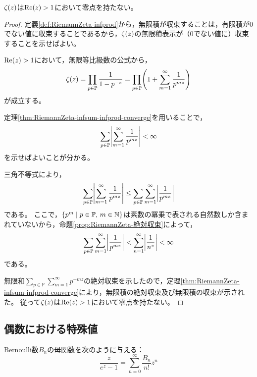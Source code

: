 \documentclass[a4paper,draft]{ltjsarticle}
\begin{document}
\begin{thm}
    $\fun{\zeta}{z}$は$\re{z}>1$において零点を持たない。
    \begin{proof}
        定義\ref{def:RiemannZeta-infprod}から，無限積が収束することは，有限積が$0$でない値に収束することであるから，$\fun{\zeta}{z}$の無限積表示が（$0$でない値に）収束することを示せばよい。

        $\re{z}>1$において，無限等比級数の公式から，
        \begin{equation}
            \fun{\zeta}{z}=\prod_{p\in\mathbb{P}}\frac{1}{1-p^{-z}}=\prod_{p\in\mathbb{P}}\pare{1+\sum_{m=1}^\infty \frac{1}{p^{mz}}}
        \end{equation}
        が成立する。

        定理\ref{thm:RiemannZeta-infsum-infprod-converge}を用いることで，
        \begin{equation}
            \sum_{p\in\mathbb{P}}\abs{\sum_{m=1}^\infty \frac{1}{p^{mz}}}<\infty
        \end{equation}
        を示せばよいことが分かる。

        三角不等式により，
        \begin{equation}
            \sum_{p\in\mathbb{P}}\abs{\sum_{m=1}^\infty \frac{1}{p^{mz}}}
            \leq\sum_{p\in\mathbb{P}}\sum_{m=1}^\infty \abs{\frac{1}{p^{mz}}}
        \end{equation}
        である。
        ここで，$\sset{p^m}{p\in\mathbb{P},\, m\in\N}$は素数の冪乗で表される自然数しか含まれていないから，命題\ref{prop:RiemannZeta-絶対収束}によって，
        \begin{equation}
            \sum_{p\in\mathbb{P}}\sum_{m=1}^\infty \abs{\frac{1}{p^{mz}}}<\sum_{n=1}^\infty \abs{\frac{1}{n^z}}<\infty
        \end{equation}
        である。

        無限和$\sum_{p\in\mathbb{P}}\sum_{m=1}^\infty p^{-mz}$の絶対収束を示したので，定理\ref{thm:RiemannZeta-infsum-infprod-converge}により，無限積の絶対収束及び無限積の収束が示された。
        従って$\fun{\zeta}{z}$は$\re{z}>1$において零点を持たない。
    \end{proof}
\end{thm}

\subsection{偶数における特殊値}
\begin{defi}[Bernoulli数]
    Bernoulli数$B_n$の母関数を次のように与える：
    \begin{equation}
        \frac{z}{e^z-1}=\sum_{n=0}^\infty \frac{B_n}{n!}z^n
        \label{eq:RiemannZeta-Bernoulli数}
    \end{equation}
\end{defi}
\end{document}
